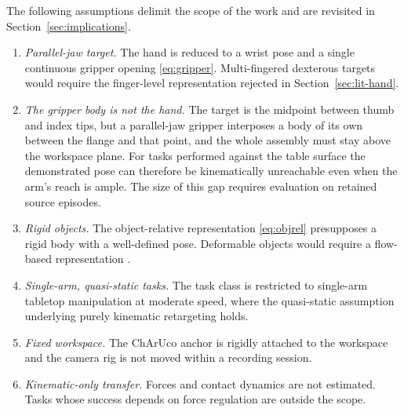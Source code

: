 The following assumptions delimit the scope of the work and are revisited in
Section~\ref{sec:implications}.

\begin{enumerate}[leftmargin=2em]
  \item \emph{Parallel-jaw target.} The hand is reduced to a wrist pose and a
        single continuous gripper opening \eqref{eq:gripper}. Multi-fingered
        dexterous targets would require the finger-level representation
        rejected in Section~\ref{sec:lit-hand}.
  \item \emph{The gripper body is not the hand.} The target is the midpoint
        between thumb and index tips, but a parallel-jaw gripper interposes a
        body of its own between the flange and that point, and the whole
        assembly must stay above the workspace plane. For tasks performed
        against the table surface the demonstrated pose can therefore be
        kinematically unreachable even when the arm's reach is ample. The
        size of this gap requires evaluation on retained source episodes.
  \item \emph{Rigid objects.} The object-relative representation
        \eqref{eq:objrel} presupposes a rigid body with a well-defined pose.
        Deformable objects would require a flow-based representation
        \cite{novaflow}.
  \item \emph{Single-arm, quasi-static tasks.} The task class is restricted to
        single-arm tabletop manipulation at moderate speed, where the
        quasi-static assumption underlying purely kinematic retargeting holds.
  \item \emph{Fixed workspace.} The ChArUco anchor is rigidly attached to the
        workspace and the camera rig is not moved within a recording session.
  \item \emph{Kinematic-only transfer.} Forces and contact dynamics are not
        estimated. Tasks whose success depends on force regulation are outside
        the scope.
\end{enumerate}
